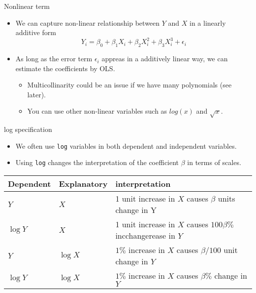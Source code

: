 \documentclass[
  ignorenonframetext,
]{beamer}
\providecommand{\tightlist}{%
  \setlength{\itemsep}{0pt}\setlength{\parskip}{0pt}}
\begin{document}
\begin{frame}{Nonlinear term}
\protect\hypertarget{nonlinear-term}{}

\begin{itemize}
\tightlist
\item
  We can capture non-linear relationship between \(Y\) and \(X\) in a
  linearly additive form \[
    Y_i = \beta_0 + \beta_1 X_i + \beta_2 X_i^2 + \beta_3 X_i^3 + \epsilon_i
    \]
\item
  As long as the error term \(\epsilon_i\) appreas in a additively
  linear way, we can estimate the coefficients by OLS.

  \begin{itemize}
  \tightlist
  \item
    Multicollinarity could be an issue if we have many polynomials (see
    later).
  \item
    You can use other non-linear variables such as \(log(x)\) and
    \(\sqrt{x}\).
  \end{itemize}
\end{itemize}

\end{frame}

\begin{frame}[fragile]{log specification}
\protect\hypertarget{log-specification}{}

\begin{itemize}
\tightlist
\item
  We often use \texttt{log} variables in both dependent and independent
  variables.
\item
  Using \texttt{log} changes the interpretation of the coefficient
  \(\beta\) in terms of scales.
\end{itemize}

\begin{longtable}[]{@{}lll@{}}
\toprule
Dependent & Explanatory & interpretation\tabularnewline
\midrule
\endhead
\(Y\) & \(X\) & 1 unit increase in \(X\) causes \(\beta\) units change
in Y\tabularnewline
\(\log Y\) & \(X\) & 1 unit increase in \(X\) causes \(100 \beta \%\)
incchangerease in \(Y\)\tabularnewline
\(Y\) & \(\log X\) & \(1\%\) increase in \(X\) causes \(\beta / 100\)
unit change in \(Y\)\tabularnewline
\(\log Y\) & \(\log X\) & \(1\%\) increase in \(X\) causes \(\beta \%\)
change in \(Y\)\tabularnewline
\bottomrule
\end{longtable}

\end{frame}
\end{document}
